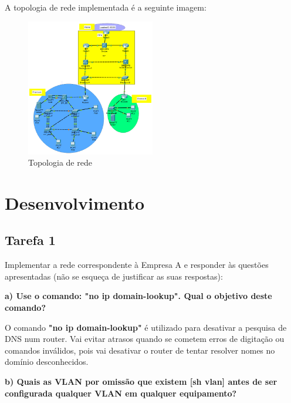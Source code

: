 \documentclass[11pt,english, openright, oneside]{book}
\begin{document}
\vspace{0.4cm}

A topologia de rede implementada é a seguinte imagem:


\begin{figure}[H]
    \centering
    \includegraphics[width=0.5\textwidth]{imagens/topologia.png}
    \caption{Topologia de rede}
    \label{fig:topologia}
\end{figure}


\chapter{Desenvolvimento}

\section{Tarefa 1}
\vspace{0.2cm}

Implementar a rede correspondente à Empresa A e responder às questões
apresentadas (não se esqueça de justificar as suas respostas):  

\vspace{0.8cm}

\textbf{a) Use o comando: "no ip domain-lookup". Qual o objetivo deste comando?}
\vspace{0.2cm}

O comando \textbf{"no ip domain-lookup"} é utilizado para desativar a pesquisa
de DNS num router. Vai evitar atrasos quando se cometem erros de digitação ou
comandos inválidos, pois vai desativar o router de tentar resolver nomes no
domínio desconhecidos.
\vspace{0.8cm}


\textbf{b) Quais as VLAN por omissão que existem [sh vlan] antes de ser configurada qualquer VLAN em qualquer equipamento?}
\vspace{0.2cm}
\end{document}
